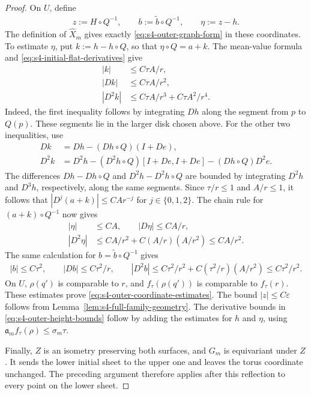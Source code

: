 \documentclass[a4paper,11pt,oneside,reqno]{amsart}
\numberwithin{equation}{section}
\theoremstyle{definition}
\begin{document}
\begin{proof}
    On $U$, define
    \begin{align*}
        z:=H\circ Q^{-1},\qquad
        b:=\widetilde b\circ Q^{-1},\qquad
        \eta:=z-h.
    \end{align*}
    The definition of $\widehat X_m$ gives exactly
    \eqref{eq:s4-outer-graph-form} in these coordinates.
    To estimate $\eta$, put $k:=h-h\circ Q$, so that
    $\eta\circ Q=a+k$. The mean-value formula and
    \eqref{eq:s4-initial-flat-derivatives} give
    \begin{align*}
        |k|&\leq C\tau A/r,\\
        |Dk|&\leq C\tau A/r^2,\\
        |D^2k|&\leq C\tau A/r^3+C\tau A^2/r^4.
    \end{align*}
    Indeed, the first inequality follows by integrating
    $Dh$ along the segment from $p$ to $Q(p)$.
    These segments lie in the larger disk chosen above.
    For the other two inequalities, use
    \begin{align*}
        Dk&=Dh-(Dh\circ Q)(I+De),\\
        D^2k&=D^2h-(D^2h\circ Q)[I+De,I+De]
                   -(Dh\circ Q)D^2e.
    \end{align*}
    The differences $Dh-Dh\circ Q$ and
    $D^2h-D^2h\circ Q$ are bounded by integrating
    $D^2h$ and $D^3h$, respectively, along the same
    segments. Since $\tau/r\leq1$ and $A/r\leq1$, it
    follows that $|D^j(a+k)|\leq CAr^{-j}$ for
    $j\in\{0,1,2\}$.
    The chain rule for $(a+k)\circ Q^{-1}$ now gives
    \begin{align*}
        |\eta|&\leq CA,\qquad |D\eta|\leq CA/r,\\
        |D^2\eta|&\leq CA/r^2+C(A/r)(A/r^2)
                        \leq CA/r^2.
    \end{align*}
    The same calculation for $b=\widetilde b\circ Q^{-1}$
    gives
    \begin{align*}
        |b|\leq C\tau^2,\qquad |Db|\leq C\tau^2/r,\qquad
        |D^2b|\leq C\tau^2/r^2
                  +C(\tau^2/r)(A/r^2)
                  \leq C\tau^2/r^2.
    \end{align*}
    On $U$, $\rho(q')$ is comparable to $r$, and
    $f_\tau(\rho(q'))$ is comparable to $f_\tau(r)$.
    These estimates prove
    \eqref{eq:s4-outer-coordinate-estimates}.
    The bound $|z|\leq C\varepsilon$ follows from
    Lemma~\ref{lem:s4-full-family-geometry}.
    The derivative bounds in
    \eqref{eq:s4-outer-height-bounds} follow by adding
    the estimates for $h$ and $\eta$, using
    $\mathfrak a_m f_\tau(\rho)\leq\sigma_m\tau$.

    Finally, $Z$ is an isometry preserving both surfaces,
    and $G_m$ is equivariant under $Z$.
    It sends the lower initial sheet to the upper one
    and leaves the torus coordinate unchanged.
    The preceding argument therefore applies after this
    reflection to every point on the lower sheet.
\end{proof}
\end{document}
